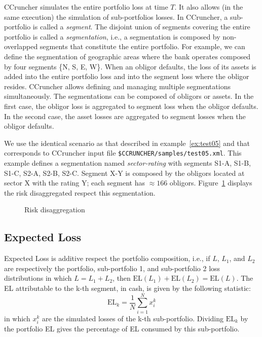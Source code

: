\documentclass[11pt,fleqn]{book} %
\begin{document}
CCruncher simulates the entire portfolio loss at time $T$. It also allows 
(in the same execution) the simulation of sub-portfolios losses. In CCruncher, 
a sub-portfolio is called a \emph{segment}. The disjoint union of segments 
covering the entire portfolio is called a \emph{segmentation}, i.e., a 
segmentation is composed by non-overlapped segments that constitute the 
entire portfolio. For example, we can define the segmentation of geographic
areas where the bank operates composed by four segments \{N, S, E, W\}.
When an obligor defaults, the loss of its assets is added into the 
entire portfolio loss and into the segment loss where the obligor resides.
CCruncher allows defining and managing multiple segmentations simultaneously. 
The segmentations can be composed of obligors or assets. In the first case, 
the obligor loss is aggregated to segment loss when the obligor defaults. 
In the second case, the asset losses are aggregated to segment losses when 
the obligor defaults.

\begin{example}
	We use the identical scenario as that described in example~\ref{ex:test05} 
	and that corresponds to CCruncher input file 
	\texttt{\$CCRUNCHER/samples/test05.xml}. This example defines a 
	segmentation named \emph{sector-rating} with segments S1-A, S1-B, S1-C, 
	S2-A, S2-B, S2-C. Segment X-Y is composed by the obligors located at sector
	X with the rating Y; each segment has $\approx 166$ obligors.
	Figure~\ref{fig:disaggregation} displays the risk disaggregated respect
	this segmentation.
\end{example}

\begin{figure}[!h]
	\centering
	\caption{Risk disaggregation}
	\label{fig:disaggregation} 
\end{figure}

\subsection{Expected Loss}
Expected Loss is additive respect the portfolio composition, i.e., if 
$L$, $L_1$, and $L_2$ are respectively the portfolio, sub-portfolio 1, 
and sub-portfolio 2 loss distributions in which $L=L_1+L_2$, then 
$\text{EL}(L_1) + \text{EL}(L_2) = \text{EL}(L)$. The EL attributable
to the k-th segment, in cash, is given by the following statistic:
\begin{displaymath}
	\text{EL}_k = \frac{1}{N} \displaystyle \sum_{i=1}^{N} x_i^k
\end{displaymath}
in which $x_i^k$ are the simulated losses of the k-th sub-portfolio.
Dividing $\text{EL}_k$ by the portfolio EL gives the percentage of EL 
consumed by this sub-portfolio.
\end{document}
